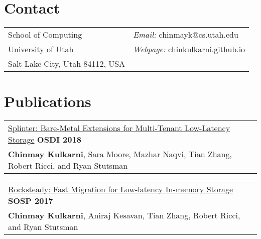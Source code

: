 \documentclass[margin,line]{res}
\begin{document}
\name{Chinmay Kulkarni\newline %
      {\small PhD Student, University of Utah}}
\begin{resume}
\section{\sc Contact}
 \begin{tabular}{@{}p{3.25in}p{4in}}
 School of Computing                             & {\it Email:  }  chinmayk@cs.utah.edu \\
 University of Utah                              & {\it Webpage:}  chinkulkarni.github.io \\
 Salt Lake City, Utah 84112, USA                 \\
 \end{tabular}


\section{\sc Publications}
 \begin{tabular}{@{}p{5.5in}p{4in}}
 \href{http://utah.systems/projects/kulkarni\_splinter}{Splinter:
 Bare-Metal Extensions for Multi-Tenant Low-Latency Storage} \hfill
 {\small\bf OSDI 2018}\\
 {\small{\bf Chinmay Kulkarni}, Sara Moore, Mazhar Naqvi, Tian Zhang, Robert
 Ricci, and Ryan Stutsman}\\
 \end{tabular}

 \vspace{-2.5pt}
 \begin{tabular}{@{}p{5.5in}p{4in}}
 \href{http://utah.systems/projects/kulkarni\_rocksteady}{Rocksteady: Fast
 Migration for Low-latency In-memory Storage} \hfill
 {\small\bf SOSP 2017}\\
 {\small{\bf Chinmay Kulkarni}, Aniraj Kesavan, Tian Zhang, Robert
 Ricci, and Ryan Stutsman}\\
 \end{tabular}



\end{resume}
\end{document}
